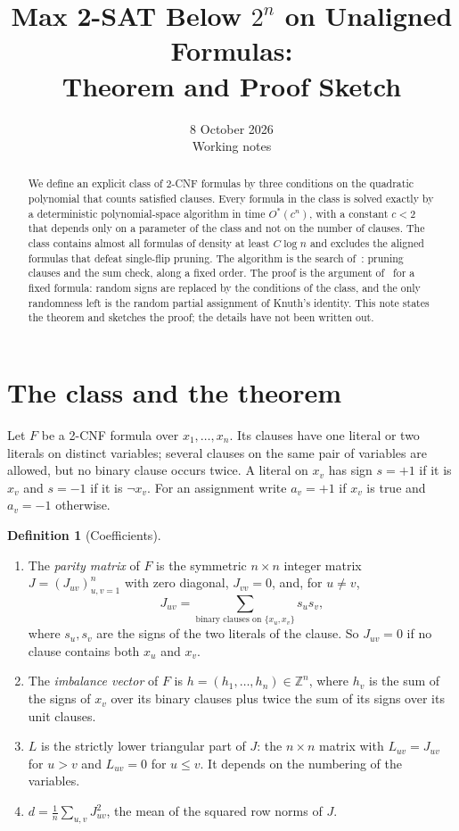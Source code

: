 \documentclass[11pt,a4paper]{article}
\title{Max 2-SAT Below $2^n$ on Unaligned Formulas:\\ Theorem and Proof Sketch}
\author{}
\date{8 October 2026\\[3pt]\small Working notes}
\theoremstyle{definition}
\newtheorem{definition}[theorem]{Definition}
\theoremstyle{remark}
\newcommand{\Ostar}{O^{*}}
\begin{document}
\maketitle

\begin{abstract}
We define an explicit class of 2-CNF formulas by three conditions on the
quadratic polynomial that counts satisfied clauses. Every formula in the class
is solved exactly by a deterministic polynomial-space algorithm in time
$\Ostar(c^n)$, with a constant $c<2$ that depends only on a parameter of the
class and not on the number of clauses. The class contains almost all formulas
of density at least $C\log n$ and excludes the aligned formulas that defeat
single-flip pruning. The algorithm is the search of~\cite{N7}: pruning clauses
and the sum check, along a fixed order. The proof is the argument of~\cite{N8}
for a fixed formula: random signs are replaced by the conditions of the class,
and the only randomness left is the random partial assignment of Knuth's
identity. This note states the theorem and sketches the proof; the details
have not been written out.
\end{abstract}

\section{The class and the theorem}\label{sec:theorem}

Let $F$ be a 2-CNF formula over $x_1,\dots,x_n$. Its clauses have one literal
or two literals on distinct variables; several clauses on the same pair of
variables are allowed, but no binary clause occurs twice. A literal on $x_v$
has sign $s=+1$ if it is $x_v$ and $s=-1$ if it is $\neg x_v$. For an
assignment write $a_v=+1$ if $x_v$ is true and $a_v=-1$ otherwise.

\begin{definition}[Coefficients]\label{def:coef}
\begin{enumerate}
 \item The \emph{parity matrix} of $F$ is the symmetric $n\times n$ integer
 matrix $J=(J_{uv})_{u,v=1}^n$ with zero diagonal, $J_{vv}=0$, and, for
 $u\ne v$,
 \[
 J_{uv}=\sum_{\text{binary clauses on }\{x_u,x_v\}}s_us_v ,
 \]
 where $s_u,s_v$ are the signs of the two literals of the clause. So
 $J_{uv}=0$ if no clause contains both $x_u$ and $x_v$.
 \item The \emph{imbalance vector} of $F$ is $h=(h_1,\dots,h_n)\in\mathbb
 Z^n$, where $h_v$ is the sum of the signs of $x_v$ over its binary clauses
 plus twice the sum of its signs over its unit clauses.
 \item $L$ is the strictly lower triangular part of $J$: the $n\times n$
 matrix with $L_{uv}=J_{uv}$ for $u>v$ and $L_{uv}=0$ for $u\le v$. It
 depends on the numbering of the variables.
 \item $d=\frac1n\sum_{u,v}J_{uv}^2$, the mean of the squared row norms of
 $J$.
\end{enumerate}
\end{definition}
\end{document}
